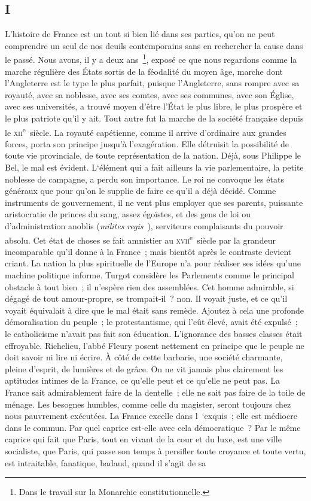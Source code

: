 \documentclass[french,twoside]{book} %
\begin{document}
\subsection[{I}]{I}
\noindent L’histoire de France est un tout si bien lié dans ses parties, qu’on ne peut comprendre un seul de nos deuils contemporains sans en rechercher la cause dans le passé. Nous avons, il y a deux ans \footnote{Dans le travail sur la Monarchie constitutionnelle.}, exposé ce que nous regardons comme la marche régulière des États sortis de la féodalité du moyen âge, marche dont l’Angleterre est le type le plus parfait, puisque l’Angleterre, sans rompre avec sa royauté, avec sa noblesse, avec ses comtes, avec ses communes, avec son Église, avec ses universités, a trouvé moyen d’être l’État le plus libre, le plus prospère et le plus patriote qu’il y ait. Tout autre fut la marche de la société française depuis le \textsc{xii}\textsuperscript{e} siècle. La royauté capétienne, comme il arrive d’ordinaire aux grandes forces, porta son principe jusqu’à l’exagération. Elle détruisit la possibilité de toute vie provinciale, de toute représentation de la nation. Déjà, sous Philippe le Bel, le mal est évident. L‘élément qui a fait ailleurs la vie parlementaire, la petite noblesse de campagne, a perdu son importance. Le roi ne convoque les états généraux que pour qu’on le supplie de faire ce qu’il a déjà décidé. Comme instruments de gouvernement, il ne vent plus employer que ses parents, puissante aristocratie de princes du sang, assez égoïstes, et des gens de loi ou d’administration anoblis ({\itshape milites} {\itshape regis} ), serviteurs complaisants du pouvoir absolu. Cet état de choses se fait amnistier au \textsc{xvii}\textsuperscript{e} siècle par la grandeur incomparable qu’il donne à la France ; mais bientôt après le contraste devient criant. La nation la plus spirituelle de l’Europe n’a pour réaliser ses idées qu’une machine politique informe. Turgot considère les Parlements comme le principal obstacle à tout bien ; il n’espère rien des assemblées. Cet homme admirable, si dégagé de tout amour-propre, se trompait-il ? non. Il voyait juste, et ce qu’il voyait équivalait à dire que le mal était sans remède. Ajoutez à cela une profonde démoralisation du peuple ; le protestantisme, qui l’eût élevé, avait été expulsé ; le catholicisme n’avait pas fait son éducation. L’ignorance des basses classes était effroyable. Richelieu, l’abbé Fleury posent nettement en principe que le peuple ne doit savoir ni lire ni écrire. À côté de cette barbarie, une société charmante, pleine d’esprit, de lumières et de grâce. On ne vit jamais plus clairement les aptitudes intimes de la France, ce qu’elle peut et ce qu’elle ne peut pas. La France sait admirablement faire de la dentelle ; elle ne sait pas faire de la toile de ménage. Les besognes humbles, comme celle du magister, seront toujours chez nous pauvrement exécutées. La France excelle dans l ‘exquis ; elle est médiocre dans le commun. Par quel caprice est-elle avec cela démocratique ? Par le même caprice qui fait que Paris, tout en vivant de la cour et du luxe, est une ville socialiste, que Paris, qui passe son temps à persifler toute croyance et toute vertu, est intraitable, fanatique, badaud, quand il s’agit de sa 
\end{document}
